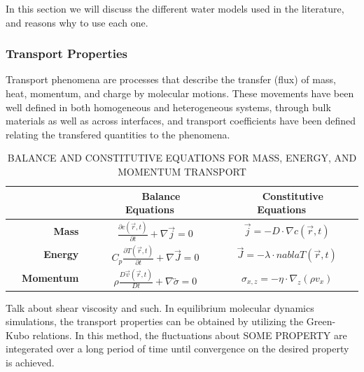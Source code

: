 In this section we will discuss the different water models used in the
literature, and reasons why to use each one. 

\subsubsection{Transport Properties}
Transport phenomena are processes that describe the transfer (flux) of
mass, heat, momentum, and charge by molecular motions. These movements
have been well defined in both homogeneous and heterogeneous systems,
through bulk materials as well as across interfaces, and transport
coefficients have been defined relating the transfered quantities to
the phenomena.


\begin{longtable}{rcc}
	\caption{BALANCE AND CONSTITUTIVE EQUATIONS FOR MASS, ENERGY, AND MOMENTUM TRANSPORT}
	\label{tab:transport}
	\\\hline \hline
 	& \textbf{~~Balance Equations~~} & \textbf{~~Constitutive Equations~~}\\ \hline 
	\textbf{~~Mass~~} & $\frac{\partial c (\vec{r}, t)}{\partial t} + \nabla \vec{j} = 0$ & $\vec{j} = -D \cdot \nabla c(\vec{r}, t)$\\
	\textbf{~~Energy~~} & $C_p \frac{\partial T (\vec{r}, t)}{\partial t} + \nabla \vec{J} = 0$ & $\vec{J} = -\lambda \cdot nabla T(\vec{r}, t)$\\
	\textbf{~~Momentum~~} & $\rho \frac{D \vec{v}(\vec{r}, t)}{Dt} + \nabla \overleftrightarrow{\sigma} = 0$ & $\sigma_{x,z} = -\eta \cdot \nabla_z (\rho v_x)$\\ \hline \hline
\end{longtable}





Talk about shear viscosity and such.  In equilibrium molecular
dynamics simulations, the transport properties can be obtained by
utilizing the Green-Kubo relations. In this method, the fluctuations
about SOME PROPERTY are integerated over a long period of time until
convergence on the desired property is achieved. 

